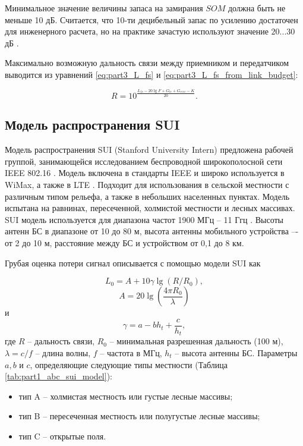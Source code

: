 Минимальное значение величины запаса на замирания $SOM$ должна быть не меньше  10 дБ. Считается, что 10-ти децибельный запас по усилению достаточен для инженерного расчета, но на практике зачастую используют значение $20 ... 30$ дБ \cite{Proletarsky}.







Максимально возможную дальность связи между приемником и передатчиком выводится из уравнений \cref{eq:part3_L_fs} и \cref{eq:part3_L_fs_from_link_budget}:

\begin{equation}
  \label{eq:part1_fspl_model_r}
  R = 10^\frac{L_{fs} - 20\lg{F} + G_{tr} + G_{recv} - K}{20}.
\end{equation}





\subsection{Модель распространения SUI}

Модель распространения SUI (Stanford University Intern) предложена рабочей группой, занимающейся исследованием беспроводной широкополосной сети IEEE 802.16 \cite{Mollel2014}. Модель включена в стандарты IEEE и широко используется в WiMax, а также в LTE \cite{Zreikat2017}. Подходит для использования в сельской местности с различным типом рельефа, а также в небольших населенных пунктах. Модель испытана на равнинах, пересеченной, холмистой местности и лесных массивах. SUI модель используется для диапазона частот 1900 МГц -- 11 Ггц \cite{Cabuk2020}. Высоты антенн БС в диапазоне от 10 до 80 м, высота антенны мобильного устройства –- от 2 до 10 м, расстояние между БС и устройством от 0,1 до 8 км.

Грубая оценка потери сигнал описывается с помощью модели SUI как

\begin{equation}
  \label{eq:part1_sui_l0}
  L_0 = A + 10\gamma\lg{(R/R_0)},
\end{equation}
$$
A = 20\lg{(\frac{4\pi R_0 }{\lambda})}
$$
и
$$
\gamma = a - b h_t + \frac{c}{h_t}, 
$$
где $R$ -- дальность связи, $R_0$ -- минимальная разрешенная дальность (100 м), $\lambda = c / f$ -- длина волны, $f$ -- частота в МГц, $h_t$ -- высота антенны БС. Параметры $a, b$ и $c$, определяющие следующие типы местности (Таблица \cref{tab:part1_abc_sui_model}):
\begin{itemize}
  \item тип A -- холмистая местность или густые лесные массивы;
  \item тип B -- пересеченная местность или полугустые лесные массивы;
  \item тип C -- открытые поля.
\end{itemize}


